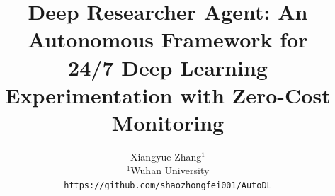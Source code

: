 \documentclass[10pt,twocolumn,letterpaper]{article}
\title{Deep Researcher Agent: An Autonomous Framework for \\24/7 Deep Learning Experimentation with Zero-Cost Monitoring}
\author{
    Xiangyue Zhang$^{1}$\\
    $^{1}$Wuhan University\\
    {\tt\small https://github.com/shaozhongfei001/AutoDL}
}
\begin{document}
\maketitle








{\small


}

\newpage
\appendix

\end{document}
